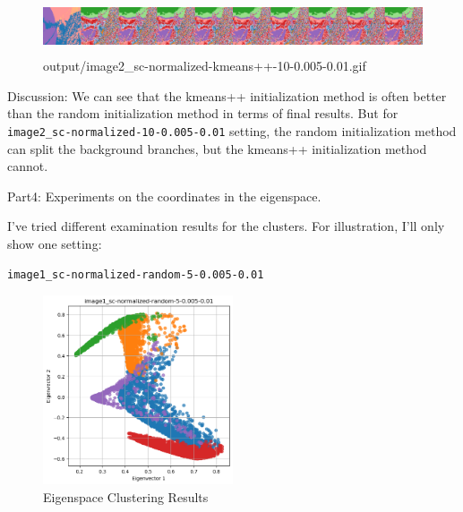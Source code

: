 \documentclass{homework}
\begin{document}
\begin{figure}[H]
    \centering
    \includegraphics[height=1.6cm]{output_flatgif/flatgif_image2_sc-ratio-kmeans++-10-0.005-0.01.png}
    \caption{output/image2\_sc-normalized-kmeans++-10-0.005-0.01.gif}
\end{figure}

Discussion: We can see that the kmeans++ initialization method is often better than the random initialization method in terms of final results. But for \texttt{image2\_sc-normalized-10-0.005-0.01} setting, the random initialization method can split the background branches, but the kmeans++ initialization method cannot.

\vspace{1em}

Part4: Experiments on the coordinates in the eigenspace.

I've tried different examination results for the clusters. For illustration, I'll only show one setting:

\texttt{image1\_sc-normalized-random-5-0.005-0.01}

\begin{figure}[H]
    \centering
    \includegraphics[width=0.5\textwidth]{image1_sc-normalized-random-5-0.005-0.01.png}
    \caption{Eigenspace Clustering Results}
\end{figure}
\end{document}
